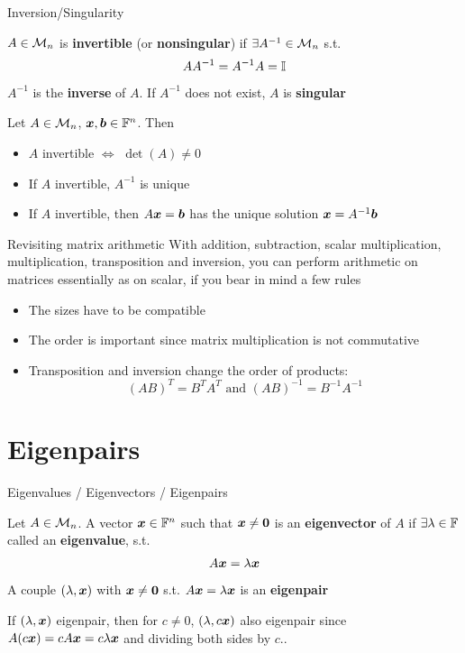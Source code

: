 \documentclass[aspectratio=169]{beamer}\usepackage[]{graphicx}\usepackage[]{xcolor}
\begin{document}
\begin{frame}{Inversion/Singularity}
\begin{definition}
$A\in\mathcal{M}_n$ is \textbf{invertible} (or \textbf{nonsingular}) if $\exists A^{-1}\in\mathcal{M}_n$ s.t.
\[
AA^{-1}=A^{-1}A=\mathbb{I}
\]
$A^{-1}$ is the \textbf{inverse} of $A$. If $A^{-1}$ does not exist, $A$ is \textbf{singular}
\end{definition}
\begin{importanttheorem}
Let $A\in\mathcal{M}_n$, $\bm{x},\bm{b}\in\mathbb{F}^n$. Then
\begin{itemize}
	\item $A$ invertible $\iff$ $\det(A)\neq 0$
	\item If $A$ invertible, $A^{-1}$ is unique
	\item If $A$ invertible, then $A\bm{x}=\bm{b}$ has the unique solution $\bm{x}=A^{-1}\bm{b}$
\end{itemize}
\end{importanttheorem}
\end{frame}

\begin{frame}{Revisiting matrix arithmetic}
With addition, subtraction, scalar multiplication, multiplication, transposition and inversion, you can perform arithmetic on matrices essentially as on scalar, if you bear in mind a few rules
\begin{itemize}
\item The sizes have to be compatible
\item The order is important since matrix multiplication is not commutative
\item Transposition and inversion change the order of products:
\[
(AB)^T=B^TA^T\textrm{ and }(AB)^{-1}=B^{-1}A^{-1}
\]
\end{itemize}
\end{frame}


\section{Eigenpairs}

\begin{frame}{Eigenvalues / Eigenvectors / Eigenpairs}
\begin{definition}
Let $A\in\mathcal{M}_n$. A vector $\bm{x}\in\mathbb{F}^n$ such that $\bx\neq\b0$ is an \textbf{eigenvector} of $A$ if $\exists\lambda\in\mathbb{F}$ called an \textbf{eigenvalue}, s.t.
\[
A\bm{x}=\lambda \bm{x}
\]
A couple $(\lambda,\bm{x})$ with $\bx\neq\b0$ s.t. $A\bm{x}=\lambda\bm{x}$ is an \textbf{eigenpair}
\end{definition}
If $(\lambda,\bm{x})$ eigenpair, then for $c\neq 0$, $(\lambda,c\bm{x})$ also eigenpair since $A(c\bm{x})=cA\bm{x}=c\lambda\bm{x}$ and dividing both sides by $c$..
\end{frame}
\end{document}
